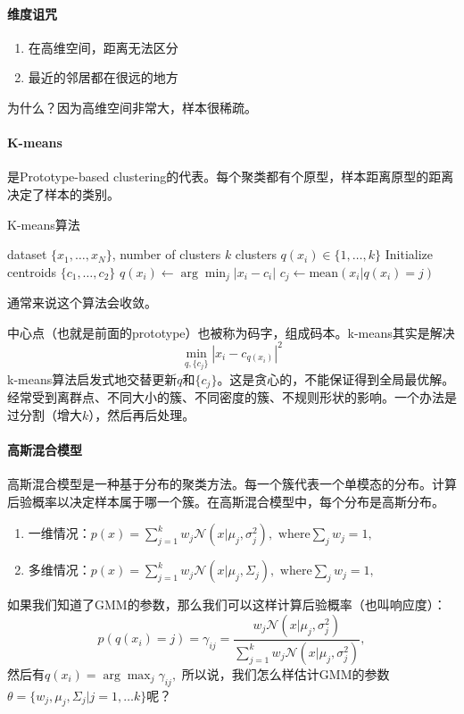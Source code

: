 \paragraph{维度诅咒}
\begin{enumerate}
    \item 在高维空间，距离无法区分 
    \item 最近的邻居都在很远的地方
\end{enumerate}
为什么？因为高维空间非常大，样本很稀疏。

\paragraph{K-means} 是Prototype-based clustering的代表。每个聚类都有个原型，样本距离原型的距离决定了样本的类别。
\begin{algorithm}[H]
\caption{K-means算法}
\label{alg:K-means}
\begin{algorithmic}[1]
\Require dataset $\{x_1, \ldots, x_N\}$, number of clusters $k$
\Ensure clusters $q(x_i)\in\{1, \ldots, k\}$
\State Initialize centroids $\{c_1, \ldots, c_2\}$
\Repeat
{}
\State $q(x_i) \leftarrow \arg \min_j |x_i - c_i|$
\EndFor
{}
\State $c_j \leftarrow \mathrm{mean}(x_i|q(x_i) = j)$
\EndFor
{}
\end{algorithmic}
\end{algorithm}
通常来说这个算法会收敛。

中心点（也就是前面的prototype）也被称为码字，组成码本。k-means其实是解决
$$\min_{q,\{c_j\}} |x_i - c_{q(x_i)}|^2$$
k-means算法启发式地交替更新$q$和$\{c_j\}$。这是贪心的，不能保证得到全局最优解。经常受到离群点、不同大小的簇、不同密度的簇、不规则形状的影响。一个办法是过分割（增大$k$），然后再后处理。

\paragraph{高斯混合模型}
高斯混合模型是一种基于分布的聚类方法。每一个簇代表一个单模态的分布。计算后验概率以决定样本属于哪一个簇。在高斯混合模型中，每个分布是高斯分布。\begin{enumerate}
    \item 一维情况：$p(x) = \sum_{j=1}^k w_j\mathcal{N}(x|\mu_j, \sigma_j^2),\text{ where} \sum_j w_j = 1,$
    \item 多维情况：$p(x) = \sum_{j=1}^k w_j\mathcal{N}(x|\mu_j, \Sigma_j),\text{ where} \sum_j w_j = 1,$
\end{enumerate}
如果我们知道了GMM的参数，那么我们可以这样计算后验概率（也叫响应度）：
$$p(q(x_i) = j) = \gamma_{ij} = \frac{w_j\mathcal{N}(x|\mu_j, \sigma_j^2)}{\sum_{j=1}^kw_j\mathcal{N}(x|\mu_j, \sigma_j^2)},$$
然后有$q(x_i) = \arg\max_j \gamma_{ij},$
所以说，我们怎么样估计GMM的参数$\theta = \{w_j, \mu_j, \Sigma_j | j = 1, \ldots k\}$呢？

